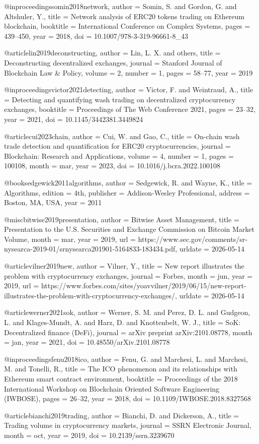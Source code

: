 @inproceedings{somin2018network,
  author = {Somin, S. and Gordon, G. and Altshuler, Y.},
  title = {Network analysis of ERC20 tokens trading on Ethereum blockchain},
  booktitle = {International Conference on Complex Systems},
  pages = {439--450},
  year = {2018},
  doi = {10.1007/978-3-319-96661-8_43}
}

@article{lin2019deconstructing,
  author = {Lin, L. X. and others},
  title = {Deconstructing decentralized exchanges},
  journal = {Stanford Journal of Blockchain Law \& Policy},
  volume = {2},
  number = {1},
  pages = {58--77},
  year = {2019}
}

@inproceedings{victor2021detecting,
  author = {Victor, F. and Weintraud, A.},
  title = {Detecting and quantifying wash trading on decentralized cryptocurrency exchanges},
  booktitle = {Proceedings of The Web Conference 2021},
  pages = {23--32},
  year = {2021},
  doi = {10.1145/3442381.3449824}
}

@article{cui2023chain,
  author = {Cui, W. and Gao, C.},
  title = {On-chain wash trade detection and quantification for ERC20 cryptocurrencies},
  journal = {Blockchain: Research and Applications},
  volume = {4},
  number = {1},
  pages = {100108},
  month = {mar},
  year = {2023},
  doi = {10.1016/j.bcra.2022.100108}
}

@book{sedgewick2011algorithms,
  author = {Sedgewick, R. and Wayne, K.},
  title = {Algorithms},
  edition = {4th},
  publisher = {Addison-Wesley Professional},
  address = {Boston, MA, USA},
  year = {2011}
}

@misc{bitwise2019presentation,
  author = {{Bitwise Asset Management}},
  title = {Presentation to the U.S. Securities and Exchange Commission on Bitcoin Market Volume},
  month = {mar},
  year = {2019},
  url = {https://www.sec.gov/comments/sr-nysearca-2019-01/srnysearca201901-5164833-183434.pdf},
  urldate = {2026-05-14}
}

@article{vilner2019new,
  author = {Vilner, Y.},
  title = {New report illustrates the problem with cryptocurrency exchanges},
  journal = {Forbes},
  month = {jun},
  year = {2019},
  url = {https://www.forbes.com/sites/yoavvilner/2019/06/15/new-report-illustrates-the-problem-with-cryptocurrency-exchanges/},
  urldate = {2026-05-14}
}

@article{werner2021sok,
  author = {Werner, S. M. and Perez, D. L. and Gudgeon, L. and Klages-Mundt, A. and Harz, D. and Knottenbelt, W. J.},
  title = {SoK: Decentralized finance (DeFi)},
  journal = {arXiv preprint arXiv:2101.08778},
  month = {jan},
  year = {2021},
  doi = {10.48550/arXiv.2101.08778}
}

@inproceedings{fenu2018ico,
  author = {Fenu, G. and Marchesi, L. and Marchesi, M. and Tonelli, R.},
  title = {The ICO phenomenon and its relationships with Ethereum smart contract environment},
  booktitle = {Proceedings of the 2018 International Workshop on Blockchain Oriented Software Engineering (IWBOSE)},
  pages = {26--32},
  year = {2018},
  doi = {10.1109/IWBOSE.2018.8327568}
}

@article{bianchi2019trading,
  author = {Bianchi, D. and Dickerson, A.},
  title = {Trading volume in cryptocurrency markets},
  journal = {SSRN Electronic Journal},
  month = {oct},
  year = {2019},
  doi = {10.2139/ssrn.3239670}
}
